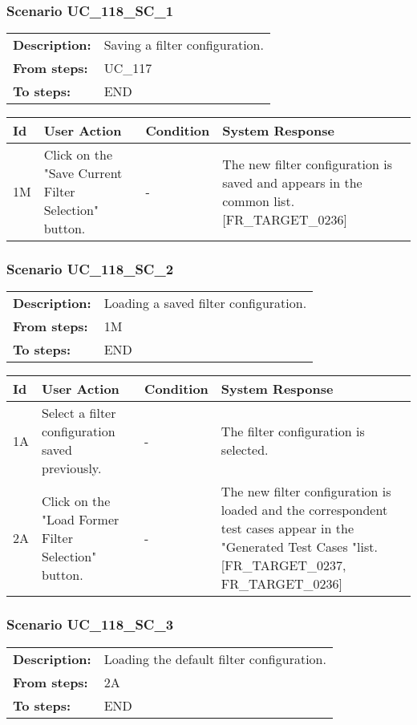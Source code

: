 \documentclass[a4paper,11pt]{article}
\newcommand{\bl}{\\ \hline}
\begin{document}
\subsubsection*{Scenario UC_118_SC_1}
\begin{tabular}{p{1in}p{4in}}
{\bf Description:} & Saving a filter configuration. \\
{\bf From steps:} & UC_117#2A \\
{\bf To steps:} & END \\
\end{tabular}
 
\begin{tabular}{|p{0.8in}|p{1.6in}|p{1.6in}|p{1.6in}|}
\hline
Id & User Action & Condition & System Response  \bl 
1M & Click on the "Save Current Filter Selection" button. & - & The new filter configuration is saved and appears in the common list. [FR_TARGET_0236] \bl 
\end{tabular}
\subsubsection*{Scenario UC_118_SC_2}
\begin{tabular}{p{1in}p{4in}}
{\bf Description:} & Loading a saved filter configuration. \\
{\bf From steps:} & 1M \\
{\bf To steps:} & END \\
\end{tabular}
 
\begin{tabular}{|p{0.8in}|p{1.6in}|p{1.6in}|p{1.6in}|}
\hline
Id & User Action & Condition & System Response  \bl 
1A & Select a filter configuration saved previously. & - & The filter configuration is selected. \bl 
2A & Click on the "Load Former Filter Selection" button. & - & The new filter configuration is loaded and the correspondent test cases appear in the "Generated Test Cases "list. [FR_TARGET_0237, FR_TARGET_0236] \bl 
\end{tabular}
\subsubsection*{Scenario UC_118_SC_3}
\begin{tabular}{p{1in}p{4in}}
{\bf Description:} & Loading the default filter configuration. \\
{\bf From steps:} & 2A \\
{\bf To steps:} & END \\
\end{tabular}
 
\end{document}
